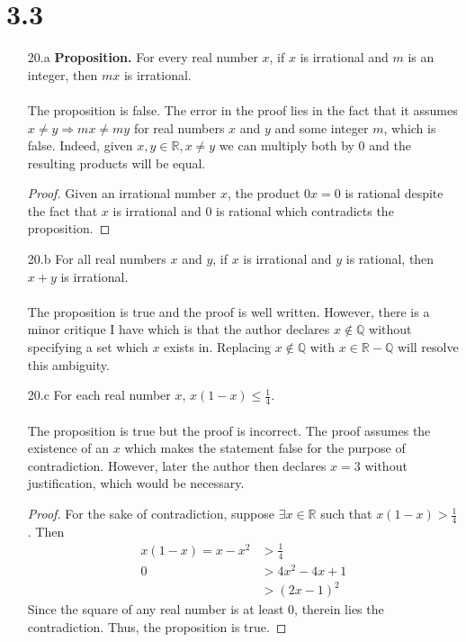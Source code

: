 \documentclass[]{article}
\begin{document}
\section*{3.3}
\begin{itemize}
	\item[20.a] \textbf{Proposition.} For every real number $x$, if $x$ is irrational and $m$ is an integer, then $mx$ is irrational. \\
	\\
	The proposition is false. The error in the proof lies in the fact that it assumes $x \neq y \Rightarrow mx \neq my$ for real numbers $x$ and $y$ and some integer $m$, which is false. Indeed, given $x, y \in \mathbb{R}, x \neq y$ we can multiply both by 0 and the resulting products will be equal.
		\begin{proof}
			Given an irrational number $x$, the product $0x = 0$ is rational despite the fact that $x$ is irrational and $0$ is rational which contradicts the proposition.
		\end{proof}
	\item[20.b] For all real numbers $x$ and $y$, if $x$ is irrational and $y$ is rational, then $x + y$ is irrational. \\
	\\
	The proposition is true and the proof is well written. However, there is a minor critique I have which is that the author declares $x \not\in \mathbb{Q}$ without specifying a set which $x$ exists in. Replacing $x \not\in \mathbb{Q}$ with $x \in \mathbb{R} - \mathbb{Q}$ will resolve this ambiguity.
	
	\item[20.c] For each real number $x$, $x(1-x) \leq \frac{1}{4}$. \\
	\\
	The proposition is true but the proof is incorrect. The proof assumes the existence of an $x$ which makes the statement false for the purpose of contradiction. However, later the author then declares $x = 3$ without justification, which would be necessary.
	\begin{proof}
		For the sake of contradiction, suppose $\exists x \in \mathbb{R}$ such that $x(1-x) > \frac{1}{4}$. Then
		\begin{align*}
			x(1-x) = x - x^2 &> \frac{1}{4} \\
			0 &> 4x^2 - 4x + 1 \\
			&> (2x - 1)^2
		\end{align*}
	Since the square of any real number is at least $0$, therein lies the contradiction. Thus, the proposition is true.
	\end{proof}
\end{itemize}
\end{document}
